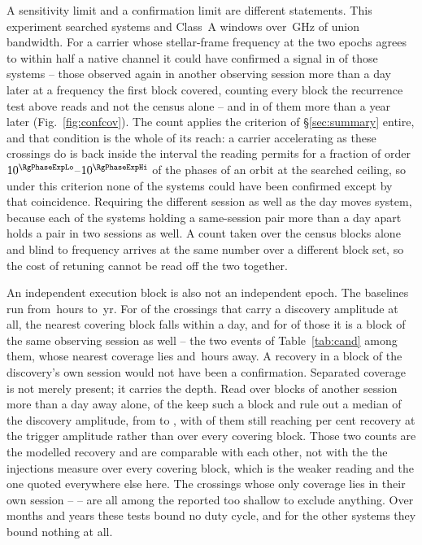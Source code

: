 A sensitivity limit and a confirmation limit are different statements. This experiment searched \RcSearchSys{} systems and \RcSearchWin{}
Class~A windows over \CvUnionA\,GHz of union bandwidth. For a carrier whose
stellar-frame frequency at the two epochs agrees to within half a native
channel it could have
confirmed a signal in \ZcConfSysDay{} of those systems -- those observed
again in another observing session more than a day later at a frequency the
first block covered, counting every block the recurrence test above reads and
not the census alone -- and
in \ZcConfSysYr{} of them more than a year later
(Fig.~\ref{fig:confcov}). The count applies the criterion of
\S\ref{sec:summary} entire, and that condition is the whole of its reach: a
carrier accelerating as these crossings do is back inside the interval the
reading permits for a fraction of order
$10^{\RgPhaseExpLo}$--$10^{\RgPhaseExpHi}$ of the phases of an orbit at the
searched ceiling, so under this criterion none of the \NSysClassA{} systems
could have been confirmed except by that coincidence. Requiring the different session as well as the day
moves \QfNSysMovedWord{} system, because each of the \QfNSysPairDropWord{}
systems holding a same-session pair more than a day apart holds a pair in two
sessions as well. A count taken over the census blocks alone and blind to
frequency arrives at the same number over a different block set, so the cost
of retuning cannot be read off the two together.

An independent execution block is also not an independent epoch. The baselines run from \RcSepMinH\,hours to \RcSepMaxYr\,yr. For
\RcNSepSameDay{} of the \RcNExclPoss{} crossings that carry a discovery
amplitude at all, the nearest covering block falls within a day, and for
\QcNHazard{} of those it is a block of the same observing session as well --
the two events of Table~\ref{tab:cand} among them, whose nearest coverage lies
\QcEvSepOneH{} and \QcEvSepTwoH\,hours away. A recovery in a block of the
discovery's own session would not have been a confirmation. Separated coverage is not merely present; it carries the depth. Read over
blocks of another session more than a day away alone, \SpNSep{} of the
\RcNExcl{} keep such a block and rule out a median \SpFracMed{} of the
discovery amplitude, from \SpFracMin{} to \SpFracMax, with \SpNPower{} of
them still reaching \RcPowerLevel{} per cent recovery at the trigger
amplitude rather than \RqNPowerHi{} over every covering block. Those two
counts are the modelled recovery and are comparable with each other, not
with the \HjNPowerHi{} the injections measure over every covering block,
which is the weaker reading and the one quoted everywhere else here.
The \QfNExclSameOnlyWord{} crossings whose
only coverage lies in their own session -- \SpNoSepList{} -- are all among
the \HjNPowerLo{} reported too shallow to exclude anything.
Over months and years these tests
bound no duty cycle, and for the other \ZcNoRepSys{} systems they bound
nothing at all.

